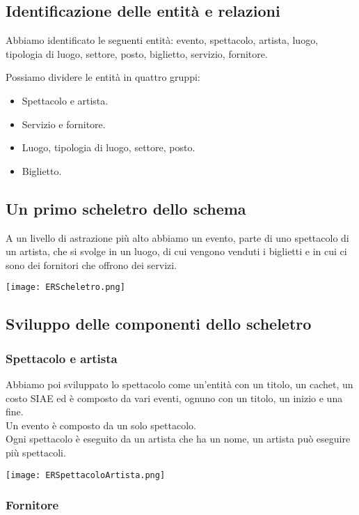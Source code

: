 \documentclass[a4paper,11pt]{article}
\begin{document}
\subsection{Identificazione delle entità e relazioni}

Abbiamo identificato le seguenti entità: evento, spettacolo, artista, luogo, tipologia di luogo, settore, posto, biglietto, servizio, fornitore.

Possiamo dividere le entità in quattro gruppi:

\begin{itemize}
    \item Spettacolo e artista.
    \item Servizio e fornitore.
    \item Luogo, tipologia di luogo, settore, posto.
    \item Biglietto.
\end{itemize}

\subsection{Un primo scheletro dello schema}

A un livello di astrazione più alto abbiamo un evento, parte di uno spettacolo di un artista, che si svolge in un luogo, di cui vengono venduti i biglietti e in cui ci sono dei fornitori che offrono dei servizi.

\texttt{[image: ERScheletro.png]}
 
\subsection{Sviluppo delle componenti dello scheletro}

\subsubsection*{Spettacolo e artista}

Abbiamo poi sviluppato lo spettacolo come un'entità con un titolo, un cachet, un costo SIAE ed è composto da vari eventi, ognuno con un titolo, un inizio e una fine.\\
Un evento è composto da un solo spettacolo.\\
Ogni spettacolo è eseguito da un artista che ha un nome, un artista può eseguire più spettacoli.

\texttt{[image: ERSpettacoloArtista.png]}

\subsubsection*{Fornitore}
\end{document}
